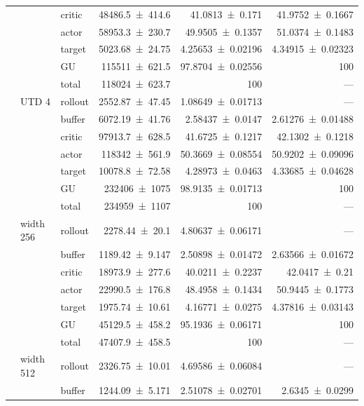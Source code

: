 {\begin{longtable}{@{}lllrrr@{}}
     &  & critic & \num{48486.5+-414.6} & \num{41.0813+-0.171} & \num{41.9752+-0.1667} \\
     &  & actor & \num{58953.3+-230.7} & \num{49.9505+-0.1357} & \num{51.0374+-0.1483} \\
     &  & target & \num{5023.68+-24.75} & \num{4.25653+-0.02196} & \num{4.34915+-0.02323} \\
     &  & GU & \num{115511+-621.5} & \num{97.8704+-0.02556} & 100 \\
     &  & total & \num{118024+-623.7} & \num{100} & --- \\
    \addlinespace[2pt]
     & UTD 4 & rollout & \num{2552.87+-47.45} & \num{1.08649+-0.01713} & --- \\
     &  & buffer & \num{6072.19+-41.76} & \num{2.58437+-0.0147} & \num{2.61276+-0.01488} \\
     &  & critic & \num{97913.7+-628.5} & \num{41.6725+-0.1217} & \num{42.1302+-0.1218} \\
     &  & actor & \num{118342+-561.9} & \num{50.3669+-0.08554} & \num{50.9202+-0.09096} \\
     &  & target & \num{10078.8+-72.58} & \num{4.28973+-0.0463} & \num{4.33685+-0.04628} \\
     &  & GU & \num{232406+-1075} & \num{98.9135+-0.01713} & 100 \\
     &  & total & \num{234959+-1107} & \num{100} & --- \\
    \addlinespace[2pt]
     & width 256 & rollout & \num{2278.44+-20.1} & \num{4.80637+-0.06171} & --- \\
     &  & buffer & \num{1189.42+-9.147} & \num{2.50898+-0.01472} & \num{2.63566+-0.01672} \\
     &  & critic & \num{18973.9+-277.6} & \num{40.0211+-0.2237} & \num{42.0417+-0.21} \\
     &  & actor & \num{22990.5+-176.8} & \num{48.4958+-0.1434} & \num{50.9445+-0.1773} \\
     &  & target & \num{1975.74+-10.61} & \num{4.16771+-0.0275} & \num{4.37816+-0.03143} \\
     &  & GU & \num{45129.5+-458.2} & \num{95.1936+-0.06171} & 100 \\
     &  & total & \num{47407.9+-458.5} & \num{100} & --- \\
    \addlinespace[2pt]
     & width 512 & rollout & \num{2326.75+-10.01} & \num{4.69586+-0.06084} & --- \\
     &  & buffer & \num{1244.09+-5.171} & \num{2.51078+-0.02701} & \num{2.6345+-0.0299} \\

\end{longtable}}
